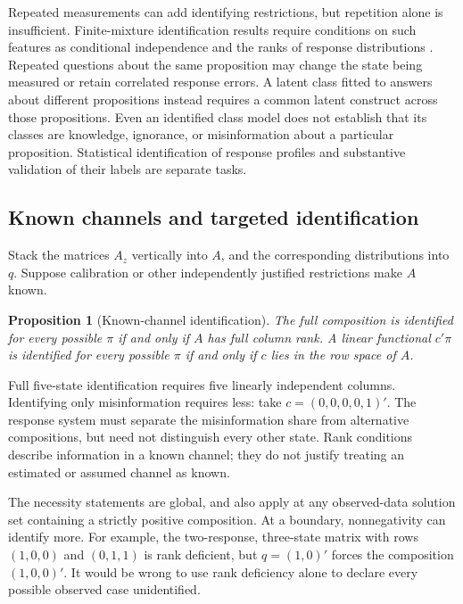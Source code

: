 \documentclass[11pt]{article}
\newtheorem{proposition}{Proposition}
\begin{document}
Repeated measurements can add identifying restrictions, but repetition alone is insufficient. Finite-mixture identification results require conditions on such features as conditional independence and the ranks of response distributions \citep{allman2009}. Repeated questions about the same proposition may change the state being measured or retain correlated response errors. A latent class fitted to answers about different propositions instead requires a common latent construct across those propositions. Even an identified class model does not establish that its classes are knowledge, ignorance, or misinformation about a particular proposition. Statistical identification of response profiles and substantive validation of their labels are separate tasks.

\subsection{Known channels and targeted identification}

Stack the matrices $A_z$ vertically into $A$, and the corresponding distributions into $q$. Suppose calibration or other independently justified restrictions make $A$ known.

\begin{proposition}[Known-channel identification]
\label{prop:rank}
The full composition is identified for every possible $\pi$ if and only if $A$ has full column rank. A linear functional $c'\pi$ is identified for every possible $\pi$ if and only if $c$ lies in the row space of $A$.
\end{proposition}

Full five-state identification requires five linearly independent columns. Identifying only misinformation requires less: take $c=(0,0,0,0,1)'$. The response system must separate the misinformation share from alternative compositions, but need not distinguish every other state. Rank conditions describe information in a known channel; they do not justify treating an estimated or assumed channel as known.

The necessity statements are global, and also apply at any observed-data solution set containing a strictly positive composition. At a boundary, nonnegativity can identify more. For example, the two-response, three-state matrix with rows $(1,0,0)$ and $(0,1,1)$ is rank deficient, but $q=(1,0)'$ forces the composition $(1,0,0)'$. It would be wrong to use rank deficiency alone to declare every possible observed case unidentified.
\end{document}
